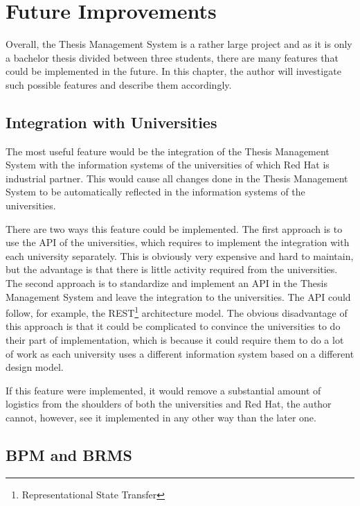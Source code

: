 \chapter{Future Improvements}
\label{sec:future-improvements}

Overall, the Thesis Management System is a rather large project and as it is only a bachelor thesis divided between three students, there are many features that could be implemented in the future. In this chapter, the author will investigate such possible features and describe them accordingly.

\section{Integration with Universities}

The most useful feature would be the integration of the Thesis Management System with the information systems of the universities of which Red Hat is industrial partner. This would cause all changes done in the Thesis Management System to be automatically reflected in the information systems of the universities. 

There are two ways this feature could be implemented. The first approach is to use the API of the universities, which requires to implement the integration with each university separately. This is obviously very expensive and hard to maintain, but the advantage is that there is little activity required from the universities. The second approach is to standardize and implement an API in the Thesis Management System and leave the integration to the universities. The API could follow, for example, the REST\footnote{Representational State Transfer} architecture model. The obvious disadvantage of this approach is that it could be complicated to convince the universities to do their part of implementation, which is because it could require them to do a lot of work as each university uses a different information system based on a different design model. 

If this feature were implemented, it would remove a substantial amount of logistics from the shoulders of both the universities and Red Hat, the author cannot, however, see it implemented in any other way than the later one.

\section{BPM and BRMS}

